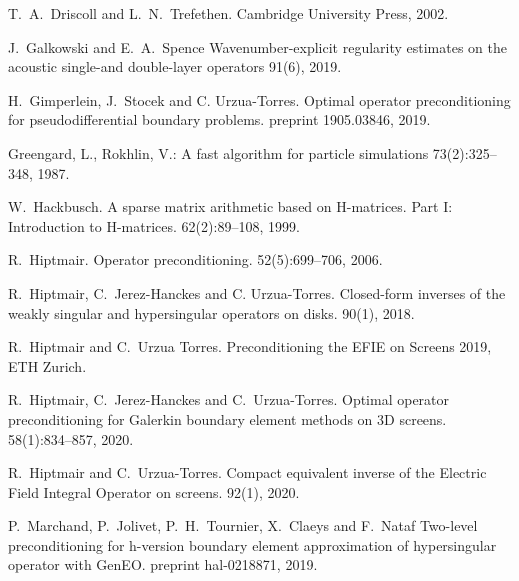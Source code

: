 \documentclass[]{report}
\begin{document}
\begin{small}
\begin{thebibliography}{0}
		T.~A.~Driscoll and L.~N.~Trefethen.
		\newblock Cambridge University Press, 2002.
		
		J.~Galkowski and E.~A.~Spence
		\newblock Wavenumber-explicit regularity estimates on the acoustic single-and double-layer operators
		91(6), 2019.
		
		H.~Gimperlein, J.~Stocek and C. Urzua-Torres.
		\newblock Optimal operator preconditioning for pseudodifferential boundary problems.
		 preprint 1905.03846, 2019.
		
		Greengard, L., Rokhlin, V.:
		\newblock A fast algorithm for particle simulations
		 73(2):325--348, 1987.
		
		W.~Hackbusch.
		\newblock A sparse matrix arithmetic based on H-matrices. Part I: Introduction to H-matrices.
		 62(2):89--108, 1999.
		
		R.~Hiptmair.
		\newblock Operator preconditioning.
		 52(5):699--706, 2006.
		
		
		R.~Hiptmair, C.~Jerez-Hanckes and C. Urzua-Torres.
		\newblock Closed-form inverses of the weakly singular and hypersingular operators on disks.
		 90(1), 2018.
		
		
		R.~Hiptmair and C.~Urzua Torres.
		Preconditioning the EFIE on Screens
		 2019, ETH Zurich.
		
		
		R.~Hiptmair, C.~Jerez-Hanckes and C.~Urzua-Torres.
		\newblock Optimal operator preconditioning for Galerkin boundary element methods on 3D screens. 
		 58(1):834--857, 2020.
		
		R.~Hiptmair and C.~Urzua-Torres.
		\newblock Compact equivalent inverse of the {E}lectric {F}ield
		{I}ntegral {O}perator on screens.
		 92(1), 2020.

               
		P.~Marchand, P.~Jolivet, P.~H.~Tournier, X.~Claeys and F.~Nataf
		\newblock Two-level preconditioning for h-version boundary element approximation of hypersingular operator with GenEO.
		 preprint hal-0218871, 2019.


\end{thebibliography}
\end{small}
\end{document}
